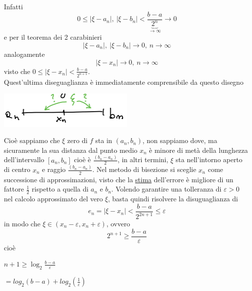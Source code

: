 \documentclass[12pt]{article}
\begin{document}
Infatti
\begin{equation*}
    0 \leq |\xi - a_n|, \ |\xi - b_n| < \frac{b-a}{\underbrace{2^n}_{\rightarrow \infty}} \longrightarrow 0
\end{equation*}
e per il teorema dei 2 carabinieri
\begin{equation*}
    |\xi - a_n|, \ |\xi - b_n| \longrightarrow 0, \ n \rightarrow \infty
\end{equation*}
analogamente
\begin{equation*}
    |\xi - x_n| \longrightarrow 0, \ n \rightarrow \infty
\end{equation*}
visto che $0 \leq |\xi - x_n| < \frac{b-a}{2^{n+1}}$.\\
Quest'ultima diseguaglianza è immediatamente comprensibile da questo disegno
\begin{center}
            \includegraphics[width=0.5\textwidth]{6.png}\par
\end{center}
Cioè sappiamo che $\xi$ zero di $f$ sta in $(a_n, b_n)$, non sappiamo dove, ma sicuramente la sua distanza dal punto medio $x_n$ è minore di metà della lunghezza dell'intervallo $[a_n, b_n]$ cioè è $\frac{(b_n - a_n)}{2}$, in altri termini, $\xi$ sta nell'intorno aperto di centro $x_n$ e raggio $\frac{(b_n - a_n)}{2}$. Nel metodo di bisezione si sceglie $x_n$ come successione di approssimazioni, visto che la \underline{stima} dell'errore è migliore di un fattore $\frac{1}{2}$ rispetto a quella di $a_n$ e $b_n$. Volendo garantire una tolleranza di $\varepsilon > 0 $ nel calcolo approssimato del vero $\xi$, basta quindi risolvere la disuguaglianza di 
\begin{equation*}
    e_n = | \xi - x_n | < \frac{b-a}{2^{2n+1}} \leq \varepsilon
\end{equation*}
in modo che $\xi \in (x_n -  \varepsilon, x_n + \varepsilon)$, ovvero 
\begin{equation*}
    2^{n+1} \geq  \frac{b-a}{\varepsilon}
\end{equation*}
cioè
\begin{center}
   $n + 1 \geq \log_2{\frac{b-a}{\varepsilon}}$
\end{center}
\begin{center}%
    $ = log_2{(b-a)} + log_2(\frac{1}{\varepsilon})$
\end{center}
\end{document}
